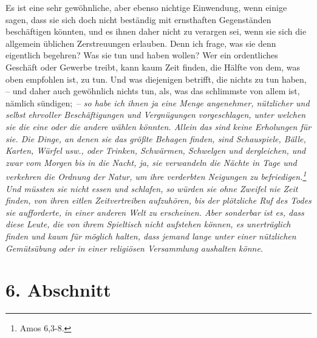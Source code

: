 \medskip

Es ist eine sehr gewöhnliche, aber ebenso nichtige Einwendung, wenn einige
sagen, dass sie sich doch nicht beständig mit ernsthaften Gegenständen
beschäftigen könnten, und es ihnen daher nicht zu verargen sei, wenn sie sich
die allgemein üblichen Zerstreuungen erlauben. Denn ich frage, was sie denn
eigentlich begehren? Was sie tun und haben wollen? Wer ein ordentliches
Geschäft oder Gewerbe treibt, kann kaum Zeit finden, die Hälfte von dem, was
oben empfohlen ist, zu tun. Und was diejenigen betrifft, die nichts zu tun
haben, -- und daher auch gewöhnlich nichts tun, als, was das schlimmste von
allem ist, nämlich sündigen;~-- \textit{so habe ich ihnen ja eine Menge
angenehmer,
nützlicher und selbst ehrvoller Beschäftigungen und Vergnügungen
vorgeschlagen, unter welchen sie die eine oder die andere wählen könnten. Allein
das
sind keine Erholungen für sie. Die Dinge, an denen sie das größte Behagen
finden, sind Schauspiele, Bälle, Karten, Würfel usw., oder Trinken,
Schwärmen, Schwelgen und dergleichen, und zwar vom Morgen bis
in die Nacht, ja,
sie verwandeln die Nächte in Tage und verkehren die Ordnung der Natur, um ihre
verderbten Neigungen zu befriedigen.\footnote{Amos 6,3-8.}
Und müssten sie nicht
essen und schlafen, so würden sie ohne Zweifel nie Zeit finden, von ihren eitlen
Zeitvertreiben aufzuhören, bis der plötzliche Ruf des Todes sie aufforderte, in
einer anderen Welt zu erscheinen. Aber sonderbar ist es, dass diese Leute, die
von
ihrem Spieltisch nicht aufstehen können, es unerträglich finden und kaum für
möglich halten, dass jemand lange unter einer nützlichen Gemütsübung oder in
einer religiösen Versammlung aushalten könne.}

\section{6. Abschnitt} \label{kap15_ab6}

